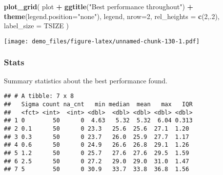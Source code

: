 \documentclass[]{book}
\newenvironment{Shaded}{\begin{snugshade}}{\end{snugshade}}
\newcommand{\DataTypeTok}[1]{\textcolor[rgb]{0.13,0.29,0.53}{#1}}
\newcommand{\DecValTok}[1]{\textcolor[rgb]{0.00,0.00,0.81}{#1}}
\newcommand{\KeywordTok}[1]{\textcolor[rgb]{0.13,0.29,0.53}{\textbf{#1}}}
\newcommand{\NormalTok}[1]{#1}
\newcommand{\OperatorTok}[1]{\textcolor[rgb]{0.81,0.36,0.00}{\textbf{#1}}}
\newcommand{\OtherTok}[1]{\textcolor[rgb]{0.56,0.35,0.01}{#1}}
\newcommand{\StringTok}[1]{\textcolor[rgb]{0.31,0.60,0.02}{#1}}
\begin{document}
\begin{Shaded}
\begin{Highlighting}[]
\KeywordTok{plot_grid}\NormalTok{(}
\NormalTok{  plot }\OperatorTok{+}
\StringTok{    }\KeywordTok{ggtitle}\NormalTok{(}\StringTok{"Best performance throughout"}\NormalTok{) }\OperatorTok{+}
\StringTok{    }\KeywordTok{theme}\NormalTok{(}\DataTypeTok{legend.position=}\StringTok{"none"}\NormalTok{),}
\NormalTok{  legend,}
  \DataTypeTok{nrow=}\DecValTok{2}\NormalTok{,}
  \DataTypeTok{rel_heights =} \KeywordTok{c}\NormalTok{(}\DecValTok{2}\NormalTok{,.}\DecValTok{2}\NormalTok{),}
  \DataTypeTok{label_size =}\NormalTok{ TSIZE}
\NormalTok{)}
\end{Highlighting}
\end{Shaded}

\texttt{[image: demo\_files/figure-latex/unnamed-chunk-130-1.pdf]}

\hypertarget{stats-66}{%
\subsubsection{Stats}\label{stats-66}}

Summary statistics about the best performance found.

\begin{Shaded}
\end{Shaded}

\begin{verbatim}
## # A tibble: 7 x 8
##   Sigma count na_cnt   min median  mean   max   IQR
##   <fct> <int>  <int> <dbl>  <dbl> <dbl> <dbl> <dbl>
## 1 0        50      0  4.63   5.32  5.32  6.04 0.313
## 2 0.1      50      0 23.3   25.6  25.6  27.1  1.20 
## 3 0.3      50      0 23.7   26.0  25.9  27.7  1.17 
## 4 0.6      50      0 24.9   26.6  26.8  29.1  1.26 
## 5 1.2      50      0 25.7   27.6  27.6  29.5  1.59 
## 6 2.5      50      0 27.2   29.0  29.0  31.0  1.47 
## 7 5        50      0 30.9   33.7  33.8  36.8  1.56
\end{verbatim}
\end{document}

